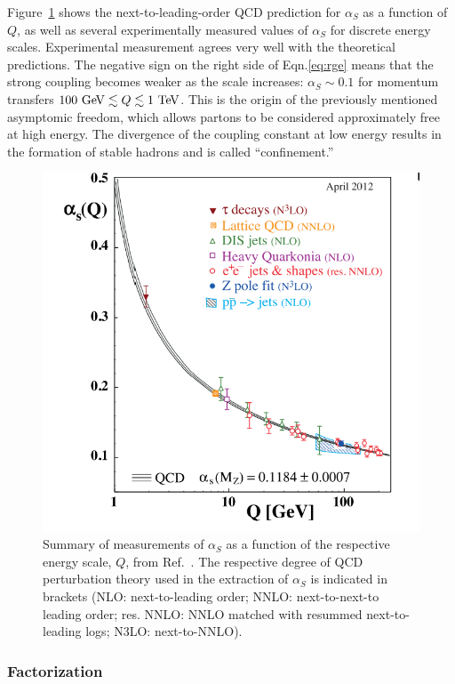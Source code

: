 Figure~\ref{fig:alphas} shows the next-to-leading-order QCD prediction for $\alpha_S$ as a function of $Q$, as well as several experimentally measured values of $\alpha_S$ for discrete energy scales. Experimental measurement agrees very well with the theoretical predictions. The negative sign on the right side of Eqn.\ref{eq:rge} means that the strong coupling becomes weaker as the scale increases: $\alpha_S \sim 0.1$ for momentum transfers $100 \gev \lesssim Q \lesssim 1 \tev$. This is the origin of the previously mentioned asymptomic freedom, which allows partons to be considered approximately free at high energy. The divergence of the coupling constant at low energy results in the formation of stable hadrons and is called ``confinement.''

\begin{figure}[h]
\includegraphics[width=\textwidth]{fig/thry/RunningAlpha.png}
\caption{Summary of measurements of $\alpha_S$ as a function of the respective energy scale, $Q$, from Ref.~\cite{PDG}. The respective degree of QCD perturbation theory used in the extraction
of $\alpha_S$ is indicated in brackets (NLO: next-to-leading order; NNLO: next-to-next-to leading order; res. NNLO: NNLO matched with resummed next-to-leading logs;
N3LO: next-to-NNLO).}
\label{fig:alphas}
\end{figure}
\subsubsection{Factorization}



